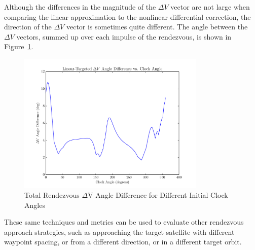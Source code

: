 \documentclass[letterpaper, preprint, paper,11pt]{AAS}	%
\begin{document}
Although the differences in the magnitude of the \(\Delta V\) vector are not large when comparing the linear approximation to the nonlinear differential correction, the direction of the \(\Delta V\) vector is sometimes quite different. The angle between the \(\Delta V\) vectors, summed up over each impulse of the rendezvous, is shown in Figure~\ref{fig:DVAngle_2}.

\begin{figure}[htb] 
	\begin{center}
		\includegraphics[width=0.8\textwidth]{DV_Angle_Diff_2_1degsteps} 
		\caption{Total Rendezvous \(\Delta\)V Angle Difference for Different Initial Clock Angles}
		\label{fig:DVAngle_2}
	\end{center}
\end{figure}

These same techniques and metrics can be used to evaluate other rendezvous approach strategies, such as approaching the target satellite with different waypoint spacing, or from a different direction, or in a different target orbit.


\clearpage





\end{document}
